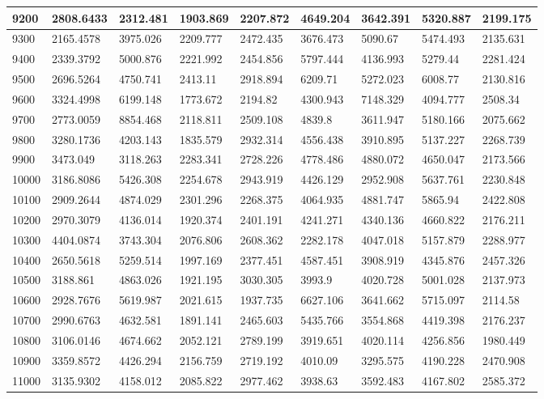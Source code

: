 \begin{table}[]
{\begin{tabular}{|l|l|l|l|l|l|l|l|l|}
9200 & 2808.6433 & 2312.481 & 1903.869 & 2207.872 & 4649.204 & 3642.391 & 5320.887 & 2199.175 \\ \hline
9300 & 2165.4578 & 3975.026 & 2209.777 & 2472.435 & 3676.473 & 5090.67 & 5474.493 & 2135.631 \\ \hline
9400 & 2339.3792 & 5000.876 & 2221.992 & 2454.856 & 5797.444 & 4136.993 & 5279.44 & 2281.424 \\ \hline
9500 & 2696.5264 & 4750.741 & 2413.11 & 2918.894 & 6209.71 & 5272.023 & 6008.77 & 2130.816 \\ \hline
9600 & 3324.4998 & 6199.148 & 1773.672 & 2194.82 & 4300.943 & 7148.329 & 4094.777 & 2508.34 \\ \hline
9700 & 2773.0059 & 8854.468 & 2118.811 & 2509.108 & 4839.8 & 3611.947 & 5180.166 & 2075.662 \\ \hline
9800 & 3280.1736 & 4203.143 & 1835.579 & 2932.314 & 4556.438 & 3910.895 & 5137.227 & 2268.739 \\ \hline
9900 & 3473.049 & 3118.263 & 2283.341 & 2728.226 & 4778.486 & 4880.072 & 4650.047 & 2173.566 \\ \hline
10000 & 3186.8086 & 5426.308 & 2254.678 & 2943.919 & 4426.129 & 2952.908 & 5637.761 & 2230.848 \\ \hline
10100 & 2909.2644 & 4874.029 & 2301.296 & 2268.375 & 4064.935 & 4881.747 & 5865.94 & 2422.808 \\ \hline
10200 & 2970.3079 & 4136.014 & 1920.374 & 2401.191 & 4241.271 & 4340.136 & 4660.822 & 2176.211 \\ \hline
10300 & 4404.0874 & 3743.304 & 2076.806 & 2608.362 & 2282.178 & 4047.018 & 5157.879 & 2288.977 \\ \hline
10400 & 2650.5618 & 5259.514 & 1997.169 & 2377.451 & 4587.451 & 3908.919 & 4345.876 & 2457.326 \\ \hline
10500 & 3188.861 & 4863.026 & 1921.195 & 3030.305 & 3993.9 & 4020.728 & 5001.028 & 2137.973 \\ \hline
10600 & 2928.7676 & 5619.987 & 2021.615 & 1937.735 & 6627.106 & 3641.662 & 5715.097 & 2114.58 \\ \hline
10700 & 2990.6763 & 4632.581 & 1891.141 & 2465.603 & 5435.766 & 3554.868 & 4419.398 & 2176.237 \\ \hline
10800 & 3106.0146 & 4674.662 & 2052.121 & 2789.199 & 3919.651 & 4020.114 & 4256.856 & 1980.449 \\ \hline
10900 & 3359.8572 & 4426.294 & 2156.759 & 2719.192 & 4010.09 & 3295.575 & 4190.228 & 2470.908 \\ \hline
11000 & 3135.9302 & 4158.012 & 2085.822 & 2977.462 & 3938.63 & 3592.483 & 4167.802 & 2585.372 \\ \hline

\end{tabular}}
\end{table}
